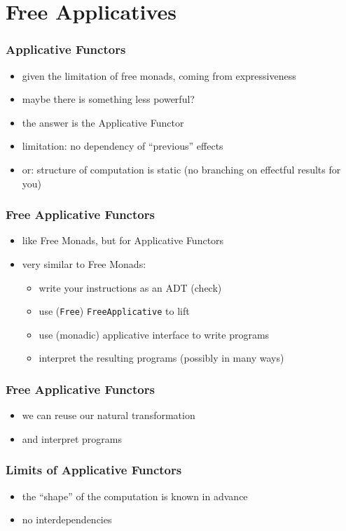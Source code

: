 \documentclass[compress]{beamer}
\begin{document}
\section{Free Applicatives}
\label{sec:free-applicatives}

\begin{frame}
  \frametitle{Applicative Functors}
  \begin{itemize}
  \item given the limitation of free monads, coming from
    expressiveness
  \item maybe there is something less powerful?
  \item the answer is the Applicative Functor
  \item limitation: no dependency of ``previous'' effects
  \item or: structure of computation is static (no branching on
    effectful results for you)
  \end{itemize}
\end{frame}

\begin{frame}
  \frametitle{Free Applicative Functors}
  \begin{itemize}
  \item like Free Monads, but for Applicative Functors
  \item very similar to Free Monads:
    \begin{itemize}
    \item write your instructions as an ADT (check)
    \item use (\texttt{Free}) \texttt{FreeApplicative} to lift
    \item use (monadic) applicative interface to write programs
    \item interpret the resulting programs (possibly in many ways)
    \end{itemize}
  \end{itemize}
\end{frame}

\begin{frame}
  \frametitle{Free Applicative Functors}
  \begin{itemize}
  \item we can reuse our natural transformation
  \item and interpret programs
  \end{itemize}
\end{frame}

\begin{frame}
  \frametitle{Limits of Applicative Functors}
  \begin{itemize}
  \item the ``shape'' of the computation is known in advance
  \item no interdependencies
  \end{itemize}
\end{frame}
\end{document}
